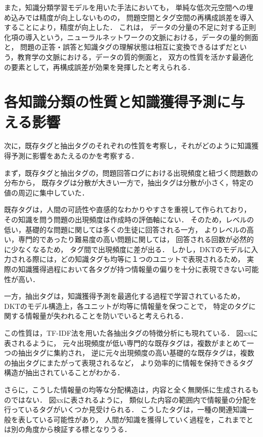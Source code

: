 また，知識分類学習モデルを用いた手法においても，
単純な低次元空間への埋め込みでは精度が向上しないものの，
問題空間とタグ空間の再構成誤差を導入することにより，精度が向上した．
これは，
データの分量の不足に対する正則化項の導入という，ニューラルネットワークの文脈における，データの量的側面と，
問題の正答・誤答と知識タグの理解状態は相互に変換できるはずだという，教育学の文脈における，データの質的側面と，
双方の性質を活かす最適化の要素として，再構成誤差が効果を発揮したと考えられる．




\section{各知識分類の性質と知識獲得予測に与える影響}
次に，既存タグと抽出タグのそれぞれの性質を考察し，それがどのように知識獲得予測に影響をあたえるのかを考察する．

まず，既存タグと抽出タグの，問題回答ログにおける出現頻度と紐づく問題数の分布から，
既存タグは分散が大きい一方で，抽出タグは分散が小さく，特定の値の周辺に集中していた．

既存タグは，人間の可読性や直感的なわかりやすさを重視して作られており，
その知識を問う問題の出現頻度は作成時の評価軸にない．
そのため，レベルの低い，基礎的な問題に関しては多くの生徒に回答される一方，
よりレベルの高い，専門的であったり難易度の高い問題に関しては，
回答される回数が必然的に少なくなるため，
タグ間で出現頻度に差が出る．
しかし，DKTのモデルに入力される際には，どの知識タグも均等に１つのユニットで表現されるため，
実際の知識獲得過程において各タグが持つ情報量の偏りを十分に表現できない可能性が高い．

一方，抽出タグは，知識獲得予測を最適化する過程で学習されているため，
DKTのモデル構造上，各ユニットが均等に情報量を保つことで，
特定のタグに関する情報量が失われることを防いでいると考えられる．

この性質は，TF-IDF法を用いた各抽出タグの特徴分析にも現れている．
図xxに表されるように，
元々出現頻度が低い専門的な既存タグは，複数がまとめて一つの抽出タグに集約され，
逆に元々出現頻度の高い基礎的な既存タグは，複数の抽出タグにまたがって表現されるなど，
より効率的に情報を保持できるタグ構造が抽出されていることがわかる．


さらに，こうした情報量の均等な分配構造は，内容と全く無関係に生成されるものではない．
図xxに表されるように，
類似した内容の範囲内で情報量の分配を行っているタグがいくつか見受けられる．
こうしたタグは，一種の関連知識一般を表している可能性があり，
人間が知識を獲得していく過程を，これまでとは別の角度から検証する標となりうる．




